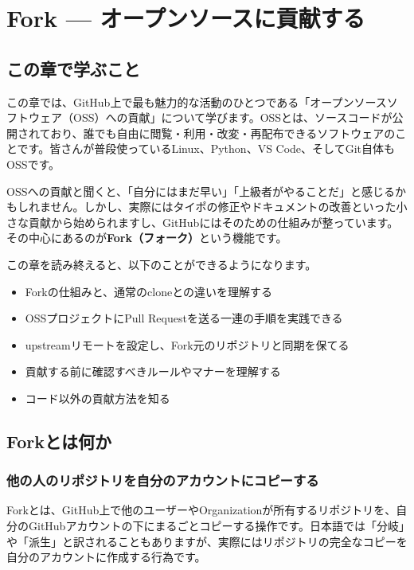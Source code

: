 \chapter{Fork --- オープンソースに貢献する}

\section{この章で学ぶこと}

この章では、GitHub上で最も魅力的な活動のひとつである「オープンソースソフトウェア（OSS）への貢献」について学びます。OSSとは、ソースコードが公開されており、誰でも自由に閲覧・利用・改変・再配布できるソフトウェアのことです。皆さんが普段使っているLinux、Python、VS Code、そしてGit自体もOSSです。

OSSへの貢献と聞くと、「自分にはまだ早い」「上級者がやることだ」と感じるかもしれません。しかし、実際にはタイポの修正やドキュメントの改善といった小さな貢献から始められますし、GitHubにはそのための仕組みが整っています。その中心にあるのが\textbf{Fork（フォーク）}という機能です。

この章を読み終えると、以下のことができるようになります。

\begin{itemize}
  \item Forkの仕組みと、通常のcloneとの違いを理解する
  \item OSSプロジェクトにPull Requestを送る一連の手順を実践できる
  \item upstreamリモートを設定し、Fork元のリポジトリと同期を保てる
  \item 貢献する前に確認すべきルールやマナーを理解する
  \item コード以外の貢献方法を知る
\end{itemize}

\section{Forkとは何か}

\subsection{他の人のリポジトリを自分のアカウントにコピーする}

Forkとは、GitHub上で他のユーザーやOrganizationが所有するリポジトリを、自分のGitHubアカウントの下にまるごとコピーする操作です。日本語では「分岐」や「派生」と訳されることもありますが、実際にはリポジトリの完全なコピーを自分のアカウントに作成する行為です。

